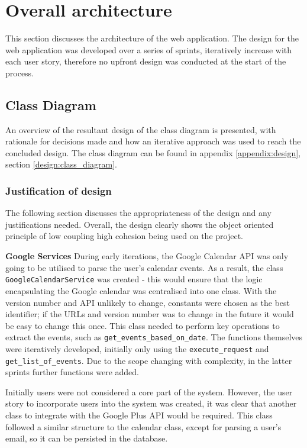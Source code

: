 \section{Overall architecture}
This section discusses the architecture of the web application. The design for the web application was developed over a series of sprints, iteratively increase with each user story, therefore no upfront design was conducted at the start of the process.

\subsection{Class Diagram}
\label{architecture:class}
An overview of the resultant design of the class diagram is presented, with rationale for decisions made and how an iterative approach was used to reach the concluded design. The class diagram can be found in appendix \ref{appendix:design}, section \ref{design:class_diagram}.

\subsubsection{Justification of design}
The following section discusses the appropriateness of the design and any justifications needed. Overall, the design clearly shows the object oriented principle of low coupling high cohesion being used on the project.

\noindent
\textbf{Google Services}
\newline
During early iterations, the Google Calendar API was only going to be utilised to parse the user's calendar events. As a result, the class \texttt{GoogleCalendarService} was created - this would ensure that the logic encapsulating the Google calendar was centralised into one class. With the version number and API unlikely to change, constants were chosen as the best identifier; if the URLs and version number was to change in the future it would be easy to change this once. This class needed to perform key operations to extract the events, such as \texttt{get\_events\_based\_on\_date}. The functions themselves were iteratively developed, initially only using the \texttt{execute\_request} and \texttt{get\_list\_of\_events}. Due to the scope changing with complexity, in the latter sprints  further functions were added.

Initially users were not considered a core part of the system. However, the user story to incorporate users into the system was created, it was clear that another class to integrate with the Google Plus API would be required. This class followed a similar structure to the calendar class, except for parsing a user's email, so it can be persisted in the database.

